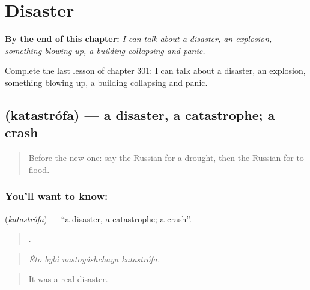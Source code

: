 
\chapter{Disaster}
\label{ch:ru-disaster}

\begin{chapteropening}
\textbf{By the end of this chapter:} \emph{I can talk about a disaster, an explosion, something blowing up, a building collapsing and panic.}

Complete the last lesson of chapter 301: I can talk about a disaster, an explosion, something blowing up, a building collapsing and panic.
\end{chapteropening}

\section[\texorpdfstring{\ru{катастрофа} (katastrófa)}{катастрофа (katastrófa)}]{ (katastrófa) — a disaster, a catastrophe; a crash}

\label{lesson:RU-C301-katastrofa}



\begin{quote}
Before the new one: say the Russian for a drought, then the Russian for to flood.
\end{quote}

\subsection*{You'll want to know: }
\textbf{} (\emph{katastrófa}) — \textquotedblleft{}a disaster, a catastrophe; a crash\textquotedblright{}.

\begin{quote}
   .
\end{quote}

\begin{quote}
\emph{Éto bylá nastoyáshchaya katastrófa.}
\end{quote}

\begin{quote}
It was a real disaster.
\end{quote}


